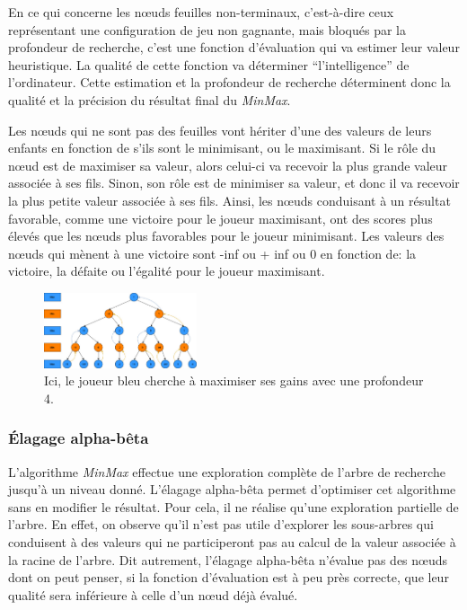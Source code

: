 En ce qui concerne les nœuds feuilles non-terminaux, c'est-à-dire ceux représentant une configuration de jeu non gagnante, mais bloqués par la 
profondeur de recherche, c'est une fonction d'évaluation qui va estimer leur valeur heuristique. La qualité de cette fonction va 
déterminer ``l'intelligence'' de l'ordinateur. Cette estimation et la profondeur de recherche déterminent donc la qualité et la 
précision du résultat final du \emph{MinMax}.

Les nœuds qui ne sont pas des feuilles vont hériter d'une des valeurs de leurs enfants en fonction de s'ils sont le minimisant, ou le maximisant.
Si le rôle du nœud est de maximiser sa valeur, alors celui-ci va recevoir la plus grande valeur associée à ses fils. Sinon, son rôle est de 
minimiser sa valeur, et donc il va recevoir la plus petite valeur associée à ses fils.
Ainsi, les nœuds conduisant à un résultat favorable, comme une victoire pour le joueur maximisant, ont des scores plus
élevés que les nœuds plus favorables pour le joueur minimisant. Les valeurs des nœuds qui mènent à une victoire sont -inf ou + inf ou 0 en fonction de:
la victoire, la défaite ou l'égalité pour le joueur maximisant. 


\begin{figure}[h]
    \begin{center}
        \includegraphics[width=0.4\textwidth]{root/MinMax.jpeg}
    \end{center}
    \caption{Ici, le joueur bleu cherche à maximiser ses gains avec une profondeur 4.}\label{fig:min_max}
\end{figure}


\subsubsection{Élagage alpha-bêta}
L'algorithme \emph{MinMax} effectue une exploration complète de l'arbre de recherche jusqu'à un niveau donné. L'élagage alpha-bêta permet d'optimiser 
cet algorithme sans en modifier le résultat. Pour cela, il ne réalise qu'une exploration
partielle de l'arbre. En effet, on observe qu'il n'est pas utile d'explorer les sous-arbres qui conduisent à des valeurs
qui ne participeront pas au calcul de la valeur associée à la racine de l'arbre. Dit autrement, l'élagage alpha-bêta n'évalue pas des nœuds
dont on peut penser, si la fonction d'évaluation est à peu près correcte, que leur qualité sera inférieure à celle d'un nœud déjà évalué.

